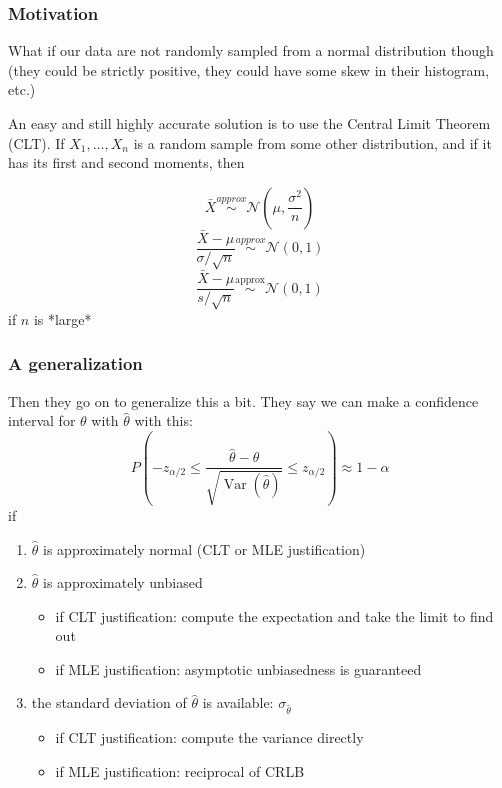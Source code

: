 \documentclass{beamer}
\begin{document}
\begin{frame}
\frametitle{Motivation}

What if our data are not randomly sampled from a normal distribution though (they could be strictly positive, they could have some skew in their histogram, etc.)
\newline

An easy and still highly accurate solution is to use the Central Limit Theorem (CLT). If $X_1, \ldots, X_n$ is a random sample from some other distribution, and if it has its first and second moments, then 

\[
\bar{X} \overset{approx}{\sim} \mathcal{N}(\mu, \frac{\sigma^2}{n})
\]
\[
\frac{\bar{X} - \mu}{\sigma / \sqrt{n}} \overset{approx}{\sim} \mathcal{N}(0,1)
\]
\[
\frac{\bar{X} - \mu}{s / \sqrt{n}} \overset{\text{approx}}{\sim} \mathcal{N}(0,1)
\]
if $n$ is *large*
\end{frame}


\begin{frame}
\frametitle{A generalization}

Then they go on to generalize this a bit. They say we can make a confidence interval for $\theta$ with $\hat{\theta}$ with this:
\[
P\left(- z_{\alpha/2} \le \frac{\hat{\theta} - \theta}{\sqrt{\operatorname{Var}\left(\hat{\theta} \right)} } \le z_{\alpha/2}\right) \approx 1 - \alpha
\]
if

\begin{enumerate}
\item $\hat{\theta}$ is approximately normal (CLT or MLE justification)
\item $\hat{\theta}$ is approximately unbiased 
  \begin{itemize}
  \item if CLT justification: compute the expectation and take the limit to find out
  \item if MLE justification: asymptotic unbiasedness is guaranteed
  \end{itemize}
\item the standard deviation of $\hat{\theta}$ is available: $\sigma_{\hat{\theta}}$
  \begin{itemize}
  \item if CLT justification: compute the variance directly
  \item if MLE justification: reciprocal of CRLB
  \end{itemize}
\end{enumerate}

\end{frame}
\end{document}
